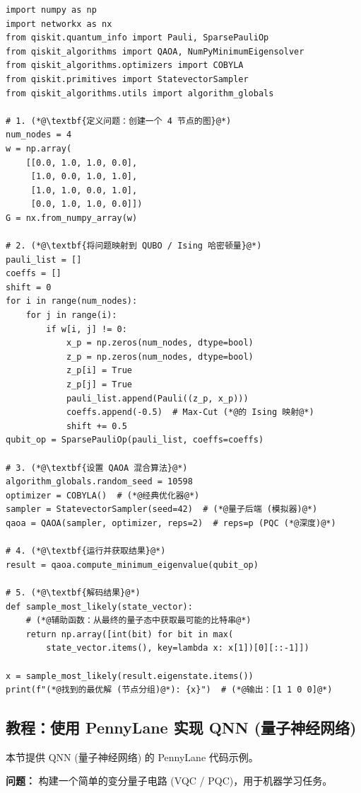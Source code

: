 \documentclass[11pt,a4paper]{article}
\begin{document}
\begin{lstlisting}[caption={QAOA Max-Cut 示例代码}]
import numpy as np
import networkx as nx
from qiskit.quantum_info import Pauli, SparsePauliOp
from qiskit_algorithms import QAOA, NumPyMinimumEigensolver
from qiskit_algorithms.optimizers import COBYLA
from qiskit.primitives import StatevectorSampler
from qiskit_algorithms.utils import algorithm_globals

# 1. (*@\textbf{定义问题：创建一个 4 节点的图}@*)
num_nodes = 4
w = np.array(
    [[0.0, 1.0, 1.0, 0.0],
     [1.0, 0.0, 1.0, 1.0],
     [1.0, 1.0, 0.0, 1.0],
     [0.0, 1.0, 1.0, 0.0]])
G = nx.from_numpy_array(w)

# 2. (*@\textbf{将问题映射到 QUBO / Ising 哈密顿量}@*)
pauli_list = []
coeffs = []
shift = 0
for i in range(num_nodes):
    for j in range(i):
        if w[i, j] != 0:
            x_p = np.zeros(num_nodes, dtype=bool)
            z_p = np.zeros(num_nodes, dtype=bool)
            z_p[i] = True
            z_p[j] = True
            pauli_list.append(Pauli((z_p, x_p)))
            coeffs.append(-0.5)  # Max-Cut (*@的 Ising 映射@*)
            shift += 0.5
qubit_op = SparsePauliOp(pauli_list, coeffs=coeffs)

# 3. (*@\textbf{设置 QAOA 混合算法}@*)
algorithm_globals.random_seed = 10598
optimizer = COBYLA()  # (*@经典优化器@*)
sampler = StatevectorSampler(seed=42)  # (*@量子后端 (模拟器)@*)
qaoa = QAOA(sampler, optimizer, reps=2)  # reps=p (PQC (*@深度)@*)

# 4. (*@\textbf{运行并获取结果}@*)
result = qaoa.compute_minimum_eigenvalue(qubit_op)

# 5. (*@\textbf{解码结果}@*)
def sample_most_likely(state_vector):
    # (*@辅助函数：从最终的量子态中获取最可能的比特串@*)
    return np.array([int(bit) for bit in max(
        state_vector.items(), key=lambda x: x[1])[0][::-1]])

x = sample_most_likely(result.eigenstate.items())
print(f"(*@找到的最优解 (节点分组)@*): {x}")  # (*@输出：[1 1 0 0]@*)
\end{lstlisting}

\subsection{教程：使用 PennyLane 实现 QNN (量子神经网络)}

本节提供 QNN (量子神经网络) 的 PennyLane 代码示例。

\textbf{问题：} 构建一个简单的变分量子电路 (VQC / PQC)，用于机器学习任务。
\end{document}

